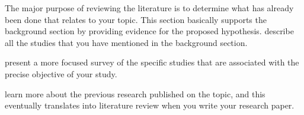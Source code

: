 The major purpose of reviewing the literature is to determine what has already been done that relates to your topic. 
This section basically supports the background section by providing evidence for the proposed hypothesis.
describe all the studies that you have mentioned in the background section. 

present a more focused survey of the specific studies that are associated with the precise objective of your study.

learn more about the previous research published on the topic, and this eventually translates into literature review when you write your research paper.